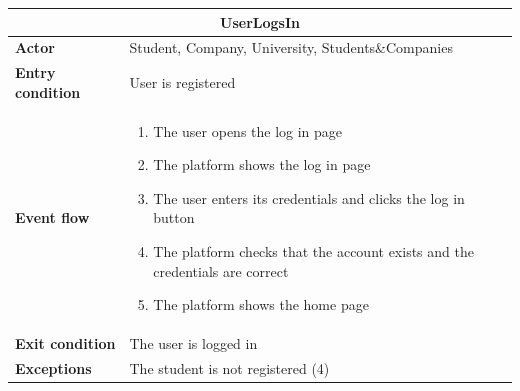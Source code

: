 \begin{enumerate}[label=\textbf{UC\arabic* -}]
\begin{table}[H]
    \centering
    \begin{tabular}{|l|m{10cm}|}
        \hline \multicolumn{2}{|c|}{\textbf{UserLogsIn}} \\
        \hline \textbf{Actor} & Student, Company, University, Students\&Companies \\
        \hline \textbf{Entry condition} & User is registered \\
        \hline \textbf{Event flow} &
            \begin{enumerate}
                \item The user opens the log in page
                \item The platform shows the log in page
                \item The user enters its credentials and clicks the log in button
                \item The platform checks that the account exists and the credentials are correct
                \item The platform shows the home page
            \end{enumerate} \\
        \hline \textbf{Exit condition} & The user is logged in \\
        \hline \textbf{Exceptions} & The student is not registered (4) \\
        \hline
    \end{tabular}
\end{table}

\begin{figure}[H]
    \centering
\end{figure}


\end{enumerate}

